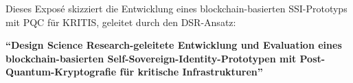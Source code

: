 Dieses Exposé skizziert die Entwicklung eines blockchain-basierten \ac{SSI}-Prototyps mit \ac{PQC} für \ac{KRITIS}, geleitet durch den \ac{DSR}-Ansatz:

\begin{center}
    \textbf{\enquote{Design Science Research-geleitete Entwicklung und Evaluation eines blockchain-basierten Self-Sovereign-Identity-Prototypen mit Post-Quantum-Kryptografie für kritische Infrastrukturen}}
\end{center}